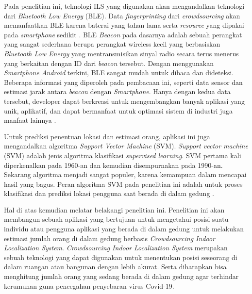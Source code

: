 \par Pada penelitian ini, teknologi ILS yang digunakan akan mengandalkan teknologi  dari \textit{Bluetooth Low Energy} (BLE). Data \textit{fingerprinting} dari \textit{crowdsourcing} akan memanfaatkan BLE karena baterai yang tahan lama serta \textit{resource} yang dipakai pada \textit{smartphone} sedikit \citep{Wan2019}. BLE \textit{Beacon} pada dasarnya adalah sebuah perangkat yang sangat sederhana berupa perangkat wireless kecil yang berbasiskan \textit{Bluetooth Low Energy} yang mentransmisikan sinyal radio secara terus menerus yang berkaitan dengan ID dari \textit{beacon} tersebut. Dengan menggunakan \textit{Smartphone Android} terkini, BLE sangat mudah untuk dibaca dan dideteksi. Beberapa informasi yang diperoleh pada pembacaan ini, seperti data sensor dan estimasi jarak antara \textit{beacon} dengan \textit{Smartphone}. Hanya dengan kedua data tersebut, developer dapat berkreasi untuk mengembangkan banyak aplikasi yang unik, aplikatif, dan dapat bermanfaat untuk optimasi sistem di industri juga manfaat lainnya \citep{Sun2019}.

\par Untuk prediksi penentuan lokasi dan estimasi orang, aplikasi ini juga mengandalkan algoritma \textit{Support Vector Machine} (SVM). \textit{Support vector machine} (SVM) adalah jenis algoritma klasifikasi \textit{supervised learning}. SVM pertama kali diperkenalkan pada 1960-an dan kemudian disempurnakan pada 1990-an. Sekarang algoritma menjadi sangat populer, karena kemampuan dalam mencapai hasil yang bagus. Peran algoritma SVM pada penelitian ini adalah untuk proses klasifikasi dan prediksi lokasi pengguna saat berada di dalam gedung \citep{Zhibin2008}.

\par Hal di atas kemudian melatar belakangi penelitian ini. Penelitian ini akan membangun sebuah aplikasi yang bertujuan untuk mengetahui posisi suatu individu atau pengguna aplikasi yang berada di dalam gedung untuk melakukan estimasi jumlah orang di dalam gedung berbasis \textit{Crowdsourcing Indoor Localization System}. \textit{Crowdsourcing Indoor Localization System} merupakan   sebuah   teknologi   yang   dapat digunakan  untuk  menentukan  posisi  seseorang  di  dalam  ruangan  atau  bangunan dengan lebih akurat. Serta diharapkan bisa menghitung jumlah orang yang sedang berada di dalam gedung agar terhindar kerumunan guna pencegahan penyebaran virus Covid-19.



\fancyhf{}
\fancyfoot[R]{\thepage}


